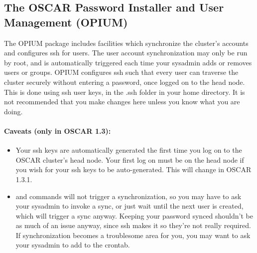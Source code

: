 %
%
%

\subsection{The OSCAR Password Installer and User Management (OPIUM)}
\label{app:opium-overview}

The OPIUM package includes facilities which synchronize the cluster's 
accounts and configures ssh for users.  The user account synchronization
may only be run by root, and is automatically triggered each time your
sysadmin adds or removes users or groups.  OPIUM configures ssh such that
every user can traverse the cluster securely without entering a password,
once logged on to the head node.  This is done using ssh user keys, in
the .ssh folder in your home directory.  It is not recommended that you
make changes here unless you know what you are doing.

\paragraph{Caveats (only in OSCAR 1.3):}
\begin{itemize}
\item Your ssh keys are automatically generated the first time you log on to
the OSCAR cluster's head node.  Your first log on must be on the head
node if you wish for your ssh keys to be auto-generated.  This will 
change in OSCAR 1.3.1.
\item {} and  commands will not trigger a synchronization,
so you may have to ask your sysadmin to invoke a sync, or
just wait until the next user is created, which will trigger a sync anyway.
Keeping your password synced shouldn't be as much of an issue anyway, since
ssh makes it so they're not really required.  If synchronization becomes
a troublesome area for you, you may want to ask your sysadmin to add
 to the crontab.
\end{itemize}

